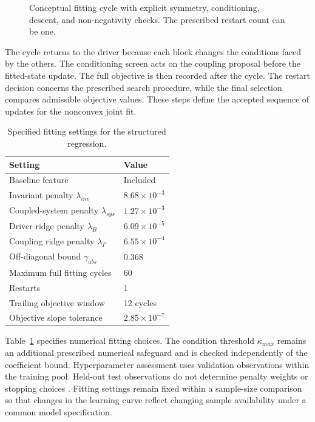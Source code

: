 \begin{figure}[htbp]
\centering

\caption{Conceptual fitting cycle with explicit symmetry, conditioning, descent, and non-negativity checks. The prescribed restart count can be one.}
\label{fig:ch5_training_cycle}
\end{figure}

The cycle returns to the driver because each block changes the conditions faced by the others. The conditioning screen acts on the coupling proposal before the fitted-state update. The full objective is then recorded after the cycle. The restart decision concerns the prescribed search procedure, while the final selection compares admissible objective values. These steps define the accepted sequence of updates for the nonconvex joint fit.

\begin{table}[htbp]
\centering
\caption{Specified fitting settings for the structured regression.}
\label{tab:icsor_fitting_settings}
\begin{tabular}{ll}
\toprule
Setting & Value\\
\midrule
Baseline feature & Included\\
Invariant penalty \(\lambda_{inv}\) & \(8.68\times10^{-3}\)\\
Coupled-system penalty \(\lambda_{sys}\) & \(1.27\times10^{-3}\)\\
Driver ridge penalty \(\lambda_B\) & \(6.09\times10^{-5}\)\\
Coupling ridge penalty \(\lambda_{\Gamma}\) & \(6.55\times10^{-4}\)\\
Off-diagonal bound \(\gamma_{abs}\) & 0.368\\
Maximum full fitting cycles & 60\\
Restarts & 1\\
Trailing objective window & 12 cycles\\
Objective slope tolerance & \(2.85\times10^{-7}\)\\
\bottomrule
\end{tabular}
\end{table}

Table~\ref{tab:icsor_fitting_settings} specifies numerical fitting choices. The condition threshold \(\kappa_{max}\) remains an additional prescribed numerical safeguard and is checked independently of the coefficient bound. Hyperparameter assessment uses validation observations within the training pool. Held-out test observations do not determine penalty weights or stopping choices \citep{Kaufman2012}. Fitting settings remain fixed within a sample-size comparison so that changes in the learning curve reflect changing sample availability under a common model specification.

